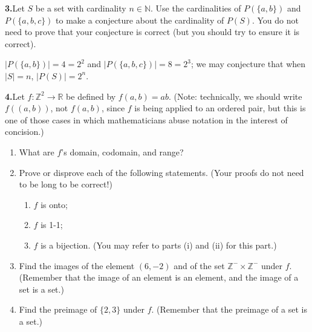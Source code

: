 \documentclass[10pt,]{book}
\theoremstyle{plain}
\theoremstyle{definition}
\theoremstyle{definition}
\theoremstyle{definition}
\theoremstyle{definition}
\numberwithin{equation}{section}
\def\Z{\mathbb{Z}}
\def\R{\mathbb{R}}
\def\N{\mathbb{N}}
\begin{document}
\par\smallskip
\noindent\textbf{3.}\quad{}Let \(S\) be a set with cardinality \(n\in \N\). Use the cardinalities of \(P(\{a,b\})\) and \(P(\{a,b,c\})\) to make a conjecture about the cardinality of \(P(S)\). You do not need to prove that your conjecture is correct (but you should try to ensure it is correct).%
\par\smallskip
\(|P(\{a,b\})|=4=2^2\) and \(|P(\{a,b,c\})|=8=2^3\); we may conjecture that when \(|S|=n\), \(|P(S)|=2^n\).%
\par\smallskip
\noindent\textbf{4.}\quad{}Let \(f: \Z^2 \to \R\) be defined by \(f(a,b)=ab\). (Note: technically, we should write \(f((a,b))\), not \(f(a,b)\), since \(f\) is being applied to an ordered pair, but this is one of those cases in which mathematicians abuse notation in the interest of concision.)%
\leavevmode%
\begin{enumerate}[label=(\alph*)]
\item\hypertarget{li-39}{}What are \(f\)'s domain, codomain, and range?%
\item\hypertarget{li-40}{}Prove or disprove each of the following statements. (Your proofs do not need to be long to be correct!)%
%
\begin{enumerate}[label=\roman*.]
\item\hypertarget{li-41}{}\(f\) is onto;%
\item\hypertarget{li-42}{}\(f\) is 1-1;%
\item\hypertarget{li-43}{}\(f\) is a bijection. (You may refer to parts (i) and (ii) for this part.)%
\end{enumerate}
\item\hypertarget{li-44}{}Find the images of the element \((6,-2)\) and of the set \(\Z^- \times \Z^-\) under \(f\). (Remember that the image of an element is an element, and the image of a set is a set.)%
\item\hypertarget{li-45}{}Find the preimage of \(\{2,3\}\) under \(f\). (Remember that the preimage of a set is a set.)%
\end{enumerate}
\par\smallskip
\leavevmode%
\end{document}
